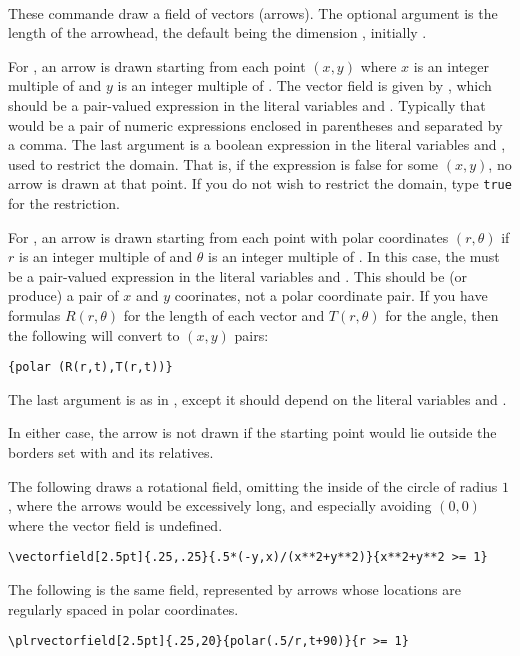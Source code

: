 \documentclass[letterpaper]{article}
\begin{document}
\begin{cd}
%
\\
%
%
%
\end{cd}

These commande draw a field of vectors (arrows). The optional argument
is the length of the arrowhead, the default being the dimension
, initially \dim{3pt}.

For , an arrow is drawn starting from each point $(x,y)$
where $x$ is an integer multiple of  and $y$ is an integer
multiple of . The vector field is given by ,
which should be a pair-valued expression in the literal variables
 and . Typically that would be a pair of numeric
expressions enclosed in parentheses and separated by a comma. The last
argument is a boolean expression in the literal variables  and
, used to restrict the domain. That is, if the expression is
false for some $(x,y)$, no arrow is drawn at that point. If you do not
wish to restrict the domain, type \texttt{true} for the restriction.

For , an arrow is drawn starting from each point with
polar coordinates $(r,\theta)$ if $r$ is an integer multiple of
 and $\theta$ is an integer multiple of . In this
case, the  must be a pair-valued expression in the literal
variables  and . This should be (or produce) a pair of $x$
and $y$ coorinates, not a polar coordinate pair. If you have formulas
$R(r,\theta)$ for the length of each vector and $T(r,\theta)$ for the
angle, then the following will convert to $(x,y)$ pairs:
\begin{verbatim}
{polar (R(r,t),T(r,t))}
\end{verbatim}
The last argument is as in , except it should depend on
the literal variables  and .

In either case, the arrow is not drawn if the starting point would lie
outside the borders set with  and its relatives.

The following draws a rotational field, omitting the inside of the
circle of radius $1$, where the arrows would be excessively long, and
especially avoiding $(0,0)$ where the vector field is undefined.
\begin{verbatim}
\vectorfield[2.5pt]{.25,.25}{.5*(-y,x)/(x**2+y**2)}{x**2+y**2 >= 1}
\end{verbatim}
The following is the same field, represented by arrows whose locations
are regularly spaced in polar coordinates.
\begin{verbatim}
\plrvectorfield[2.5pt]{.25,20}{polar(.5/r,t+90)}{r >= 1}
\end{verbatim}
\end{document}

